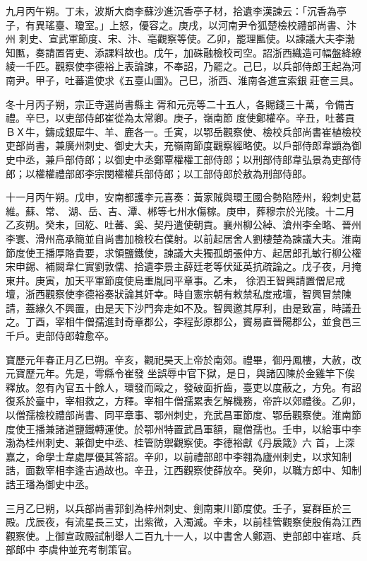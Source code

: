\begin{pinyinscope}
 九月丙午朔。丁未，波斯大商李蘇沙進沉香亭子材，拾遺李漢諫云：「沉香為亭子，有異瑤臺、瓊室。」上怒，優容之。庚戌，以河南尹令狐楚檢校禮部尚書、汴州
 刺史、宣武軍節度、宋、汴、亳觀察等使。乙卯，罷理匭使。以諫議大夫李渤知匭，奏請置胥吏、添課料故也。戊午，加硃融檢校司空。詔浙西織造可幅盤絳繚綾一千匹。觀察使李德裕上表論諫，不奉詔，乃罷之。己巳，以兵部侍郎王起為河南尹。甲子，吐蕃遣使求《五臺山圖》。己巳，浙西、淮南各進宣索銀莊奩三具。



 冬十月丙子朔，宗正寺選尚書縣主胥和元亮等二十五人，各賜錢三十萬，令備吉禮。辛巳，以吏部侍郎崔從為太常卿。庚子，嶺南節
 度使鄭權卒。辛丑，吐蕃貢ＢＸ牛，鑄成銀犀牛、羊、鹿各一。壬寅，以鄂岳觀察使、檢校兵部尚書崔植檢校吏部尚書，兼廣州刺史、御史大夫，充嶺南節度觀察經略使。以戶部侍郎韋顗為御史中丞，兼戶部侍郎；以御史中丞鄭覃權權工部侍郎；以刑部侍郎韋弘景為吏部侍郎；以權權禮部郎李宗閔權權兵部侍郎；以工部侍郎於敖為刑部侍郎。



 十一月丙午朔。戊申，安南都護李元喜奏：黃家賊與環王國合勢陷陸州，殺刺史葛維。蘇、常、
 湖、岳、吉、潭、郴等七州水傷稼。庚申，葬穆宗於光陵。十二月乙亥朔。癸未，回紇、吐蕃、奚、契丹遣使朝貢。襄州柳公綽、滄州李全略、晉州李寰、滑州高承簡並自尚書加檢校右僕射。以前起居舍人劉棲楚為諫議大夫。淮南節度使王播厚賂貴要，求領鹽鐵使，諫議大夫獨孤朗張仲方、起居郎孔敏行柳公權宋申錫、補闕韋仁實劉敦儒、拾遺李景主薛廷老等伏延英抗疏論之。戊子夜，月掩東井。庚寅，加天平軍節度使烏重胤同平章事。乙未，
 徐泗王智興請置僧尼戒壇，浙西觀察使李德裕奏狀論其奸幸。時自憲宗朝有敕禁私度戒壇，智興冒禁陳請，蓋緣久不興置，由是天下沙門奔走如不及。智興邀其厚利，由是致富，時議丑之。丁酉，宰相牛僧孺進封奇章郡公，李程彭原郡公，竇易直晉陽郡公，並食邑三千戶。吏部侍郎韓愈卒。



 寶歷元年春正月乙巳朔。辛亥，觀祀昊天上帝於南郊。禮畢，御丹鳳樓，大赦，改元寶歷元年。先是，雩縣令崔發
 坐誤辱中官下獄，是日，與諸囚陳於金雞竿下俟釋放。忽有內官五十餘人，環發而毆之，發破面折齒，臺吏以度蔽之，方免。有詔復系於臺中，宰相救之，方釋。宰相牛僧孺累表乞解機務，帝許以郊禮後。乙卯，以僧孺檢校禮部尚書、同平章事、鄂州刺史，充武昌軍節度、鄂岳觀察使。淮南節度使王播兼諸道鹽鐵轉運使。於鄂州特置武昌軍額，寵僧孺也。壬申，以給事中李渤為桂州刺史、兼御史中丞、桂管防禦觀察使。李德裕獻《丹扆箴》六
 首，上深嘉之，命學士韋處厚優其答詔。辛卯，以前禮部郎中李翱為廬州刺史，以求知制誥，面數宰相李逢吉過故也。辛丑，江西觀察使薛放卒。癸卯，以職方郎中、知制誥王璠為御史中丞。



 三月乙巳朔，以兵部尚書郭釗為梓州刺史、劍南東川節度使。壬子，宴群臣於三殿。戊辰夜，有流星長三丈，出紫微，入濁滅。辛未，以前桂管觀察使殷侑為江西觀察使。上御宣政殿試制舉人二百九十一人，以中書舍人鄭涵、吏部郎中崔琯、兵部郎中
 李虞仲並充考制策官。




\end{pinyinscope}
